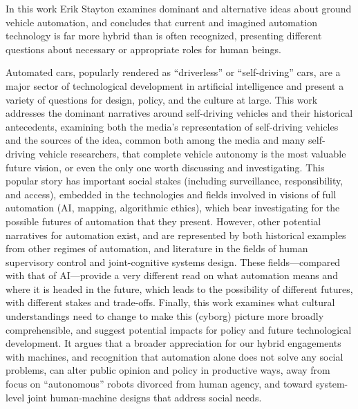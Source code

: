 % 
% 
%

In this work Erik Stayton examines dominant and alternative ideas about ground
vehicle automation, and concludes that current and imagined automation
technology is far more hybrid than 
is often recognized, presenting different questions about necessary or
appropriate roles for human beings.

Automated cars, popularly rendered as ``driverless'' or
``self-driving'' cars, are a major sector of technological
development in artificial intelligence and present a variety of
questions for design, policy, and the culture at large. This work addresses the
dominant narratives around self-driving 
vehicles and their historical antecedents, examining both the media's representation
of self-driving vehicles and 
the sources of the idea, common both among the media and many
self-driving vehicle researchers, that complete vehicle autonomy is
the most valuable future vision, or even the only one  worth
discussing and investigating. 
This popular story has important social stakes (including
surveillance, responsibility, and access), embedded in the
technologies and fields involved in visions of full
automation (AI, mapping, algorithmic ethics), which bear investigating
for the possible futures of 
automation that they present.
However, other potential narratives for automation exist, and are
represented by both historical examples from other regimes of
automation, and
literature in the fields of human supervisory control and
joint-cognitive systems design. These fields---compared with
that of AI---provide a very
different read on what automation means and where it is headed in the
future, which leads to the possibility of different futures, with
different stakes and trade-offs. Finally, this work examines what cultural
understandings need to change to 
make this (cyborg) picture more broadly comprehensible, and suggest potential
impacts for policy and future technological development. It argues that
a broader appreciation for 
our hybrid engagements with machines, and recognition that automation
alone does not solve any social problems, can alter public
opinion and policy in productive ways, away from focus on
``autonomous'' robots divorced from human agency, and toward
system-level joint human-machine designs that address social needs. 
